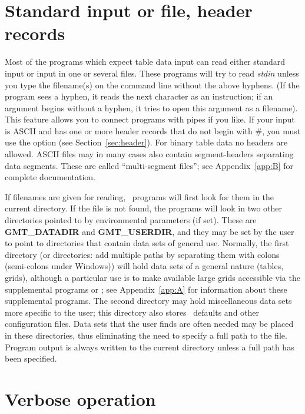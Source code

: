 \section{Standard input or file, header records}

Most of the programs which expect table data input can read
either standard input or input in one or several files.
These programs will try to read \emph{stdin} unless you type
the filename(s) on the command line without the above hyphens.
(If the program sees a hyphen, it reads the next character
as an instruction; if an argument begins without a hyphen,
it tries to open this argument as a filename).
This feature allows you to connect programs with pipes if
you like.  If your input is ASCII and has one or more header
records that do not begin with \#, you must use the 
option (see Section~\ref{sec:header}).
For binary table data no headers are allowed.
ASCII files may in many cases also contain segment-headers
separating data segments.  These are called ``multi-segment files'';
see Appendix~\ref{app:B} for complete documentation. 

If filenames are given for reading, \GMT\ programs will first look for them in the
current directory.  If the file is not found, the programs
will look in two other directories pointed to by environmental
parameters (if set).  These are \textbf{GMT\_DATADIR} and
\textbf{GMT\_USERDIR}, and they may be set by the user to point to directories
that contain data sets of general use.  Normally, the first directory (or directories:
add multiple paths by separating them with colons (semi-colons under Windows)) will
hold data sets of a general nature (tables, grids), although a particular use
is to make available large grids accessible via the supplemental programs 
or ; see Appendix~\ref{app:A} for information
about these supplemental programs.  The second directory may hold miscellaneous
data sets more specific to the user; this directory also stores \GMT\ defaults and other
configuration files.  Data sets that the user finds are often needed
may be placed in these directories, thus eliminating the need to specify
a full path to the file.  Program output is always written to the
current directory unless a full path has been specified.

\section{Verbose operation}

